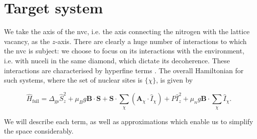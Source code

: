 \section{Target system}\label{sec:target_system}
We take the axis of the \gls{nvc}, i.e. the axis connecting the \gls{nitrogen} with the 
    lattice vacancy, as the $z$-axis.
There are clearly a huge number of interactions to which the \gls{nvc} is subject:
    we choose to focus on its interactions with the environment, 
    i.e. with nuceli in the same diamond, which dictate its decoherence. 
These interactions are characterised by hyperfine terms \cite{smeltzer201113c}.
The overall Hamiltonian for such systems, where the set of nuclear sites is $\{\chi\}$,
    is given by 

\begin{equation}
    \label{eqn:nv_ham_full}
    \hat{H}_{\mathrm{full}} 
    = 
    \Delta_{\textrm{gs}} \hat{S}_z^2 
    + \mu_B g \mathbf{B} \cdot \mathbf{S} 
    + \mathbf{S} \cdot \sum_{\chi} \left( \mathbf{A}_{\chi} \cdot \hat{I}_{\chi} \right) 
    + P \hat{I}_z^2 
    + \mu_n g \mathbf{B} \cdot \sum_{ \chi} \hat{I}_{\chi}.
\end{equation}

We will describe each term, as well as approximations which enable us to simplify the space considerably. 

